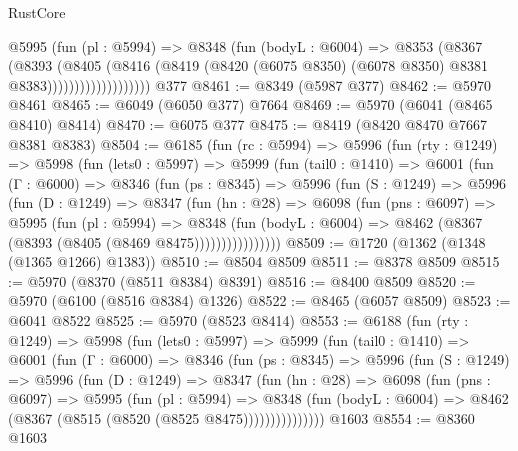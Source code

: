 \begin{lexlean}{RustCore}
\begin{coremodule}
                        @5995
                          (fun (pl : @5994) =>
                          @8348
                            (fun (bodyL : @6004) =>
                            @8353
                              (@8367
                                (@8393
                                  (@8405
                                    (@8416
                                      (@8419
                                        (@8420
                                          (@6075 @8350)
                                          (@6078 @8350)
                                          @8381
                                          @8383)))))))))))))))))))
    @377
@8461 := @8349 (@5987 @377)
@8462 := @5970 @8461
@8465 := @6049 (@6050 @377) @7664
@8469 := @5970 (@6041 (@8465 @8410) @8414)
@8470 := @6075 @377
@8475 := @8419 (@8420 @8470 @7667 @8381 @8383)
@8504 := @6185
    (fun (rc : @5994) =>
    @5996
      (fun (rty : @1249) =>
      @5998
        (fun (lets0 : @5997) =>
        @5999
          (fun (tail0 : @1410) =>
          @6001
            (fun (Γ : @6000) =>
            @8346
              (fun (ps : @8345) =>
              @5996
                (fun (S : @1249) =>
                @5996
                  (fun (D : @1249) =>
                  @8347
                    (fun (hn : @28) =>
                    @6098
                      (fun (pns : @6097) =>
                      @5995
                        (fun (pl : @5994) =>
                        @8348
                          (fun (bodyL : @6004) =>
                          @8462 (@8367 (@8393 (@8405 (@8469 @8475))))))))))))))))
@8509 := @1720 (@1362 (@1348 (@1365 @1266) @1383))
@8510 := @8504 @8509
@8511 := @8378 @8509
@8515 := @5970 (@8370 (@8511 @8384) @8391)
@8516 := @8400 @8509
@8520 := @5970 (@6100 (@8516 @8384) @1326)
@8522 := @8465 (@6057 @8509)
@8523 := @6041 @8522
@8525 := @5970 (@8523 @8414)
@8553 := @6188
    (fun (rty : @1249) =>
    @5998
      (fun (lets0 : @5997) =>
      @5999
        (fun (tail0 : @1410) =>
        @6001
          (fun (Γ : @6000) =>
          @8346
            (fun (ps : @8345) =>
            @5996
              (fun (S : @1249) =>
              @5996
                (fun (D : @1249) =>
                @8347
                  (fun (hn : @28) =>
                  @6098
                    (fun (pns : @6097) =>
                    @5995
                      (fun (pl : @5994) =>
                      @8348
                        (fun (bodyL : @6004) =>
                        @8462 (@8367 (@8515 (@8520 (@8525 @8475)))))))))))))))
    @1603
@8554 := @8360 @1603

\end{coremodule}
\end{lexlean}
